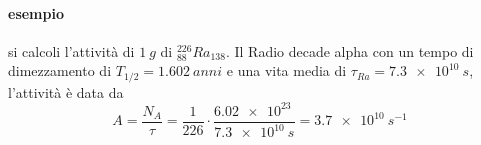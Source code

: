 \paragraph{esempio} si calcoli l'attività di $\SI{1}{g}$ di $^{226}_{88} Ra_{138}$.
Il Radio decade alpha con un tempo di dimezzamento di $T_{1/2} = \SI{1.602}{anni}$ e una vita media di $\tau_{Ra} = \SI{7.3e10}{s}$, l'attività è data da
\begin{equation}
A = \frac{N_A}{\tau} = \frac{1}{226} \cdot \frac{\SI{6.02e23}{}}{\SI{7.3e10}{s}} = \SI{3.7e10}{s^{-1}}
\end{equation}

















